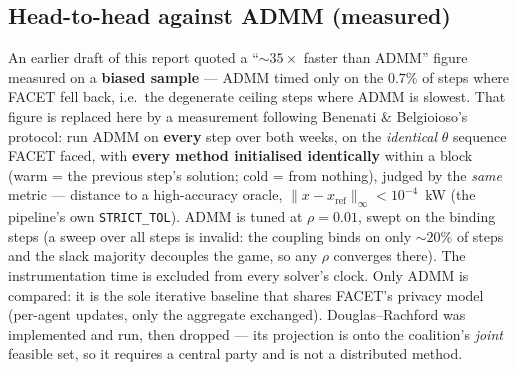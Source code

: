\documentclass[11pt, letterpaper]{article}
\begin{document}
\subsection{Head-to-head against ADMM (measured)}\label{sec:exp2}
An earlier draft of this report quoted a ``$\sim\!35\times$ faster than ADMM'' figure measured on a
\textbf{biased sample} --- ADMM timed only on the $0.7\%$ of steps where FACET fell back, i.e.\ the
degenerate ceiling steps where ADMM is slowest. That figure is replaced here by a measurement
following Benenati \& Belgioioso's protocol: run ADMM on \textbf{every} step over both weeks, on the
\emph{identical} $\theta$ sequence FACET faced, with \textbf{every method initialised identically}
within a block (warm = the previous step's solution; cold = from nothing), judged by the \emph{same}
metric --- distance to a high-accuracy oracle, $\lVert x-x_{\mathrm{ref}}\rVert_\infty<10^{-4}$~kW
(the pipeline's own \texttt{STRICT\_TOL}). ADMM is tuned at $\rho=0.01$, swept on the binding steps
(a sweep over all steps is invalid: the coupling binds on only $\sim\!20\%$ of steps and the slack
majority decouples the game, so any $\rho$ converges there). The instrumentation time is excluded
from every solver's clock. Only ADMM is compared: it is the sole iterative baseline that shares
FACET's privacy model (per-agent updates, only the aggregate exchanged). Douglas--Rachford was
implemented and run, then dropped --- its projection is onto the coalition's \emph{joint} feasible
set, so it requires a central party and is not a distributed method.


\end{document}
